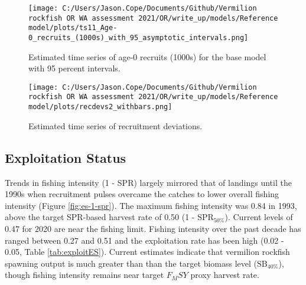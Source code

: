 \documentclass[11pt,
  english,
  a4paper,
]{article}
\begin{document}

\begin{figure}
\centering
\texttt{[image: C:/Users/Jason.Cope/Documents/Github/Vermilion rockfish OR WA assessment 2021/OR/write\_up/models/Reference model/plots/ts11\_Age-0\_recruits\_(1000s)\_with\_95\_asymptotic\_intervals.png]}
\caption{Estimated time series of age-0 recruits (1000s) for the base model with 95 percent intervals.\label{fig:es-recruits}}
\end{figure}

\tagmcend\tagstructend


\begin{figure}
\centering
\texttt{[image: C:/Users/Jason.Cope/Documents/Github/Vermilion rockfish OR WA assessment 2021/OR/write\_up/models/Reference model/plots/recdevs2\_withbars.png]}
\caption{Estimated time series of recruitment deviations.\label{fig:es-rec-devs}}
\end{figure}

\tagmcend\tagstructend

\clearpage


\hypertarget{exploitation-status}{%
\subsection*{Exploitation Status}\label{exploitation-status}}

\leavevmode\tagmcend\tagstructend


Trends in fishing intensity (1 - SPR) largely mirrored that of landings until the 1990s when recruitment pulses overcame the catches to lower overall fishing intensity (Figure \ref{fig:es-1-spr}). The maximum fishing intensity was 0.84 in 1993, above the target SPR-based harvest rate of 0.50 (1 - {\(\text{SPR}_{50\%}\)\leavevmode\tagmcend\tagstructend}). Current levels of 0.47 for 2020 are near the fishing limit. Fishing intensity over the past decade has ranged between 0.27 and 0.51 and the exploitation rate has been high (0.02 - 0.05, Table \ref{tab:exploitES}). Current estimates indicate that vermilion rockfish spawning output is much greater than than the target biomass level ({\(\text{SB}_{40\%}\)\leavevmode\tagmcend\tagstructend}), though fishing intensity remains near target {\(F_MSY\)\leavevmode\tagmcend\tagstructend} proxy harvest rate.
\end{document}
